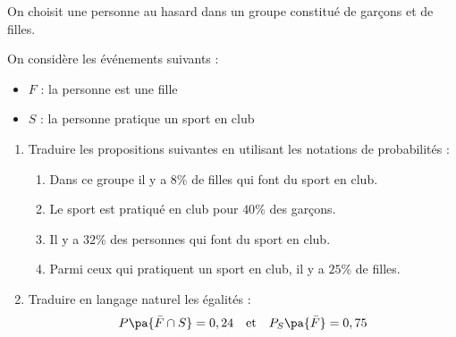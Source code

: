 \begin{exo}
	On choisit une personne au hasard dans un groupe constitué de garçons et de filles.

	On considère les événements suivants :
	\begin{itemize}
		\item $F$ : \og{} la personne est une fille \fg{}
		\item $S$ : \og{} la personne pratique un sport en club \fg{}
	\end{itemize}
	\begin{enumerate}
		\item Traduire les propositions suivantes en utilisant les notations de probabilités :
		      \begin{enumerate}
			      \item Dans ce groupe il y a $8$\% de filles qui font du sport en club.
			      \item Le sport est pratiqué en club pour $40$\% des garçons.
			      \item Il y a $32$\% des personnes qui font du sport en club.
			      \item Parmi ceux qui pratiquent un sport en club, il y a $25$\% de filles.
		      \end{enumerate}
		\item Traduire en langage naturel les égalités :\vspace*{-2mm}
		      \[
			      P\pa{\bar{F} \cap S} = 0,24\quad\text{et}\quad P_{S}\pa{\bar{F}} = 0,75
		      \]

	\end{enumerate}
\end{exo}
